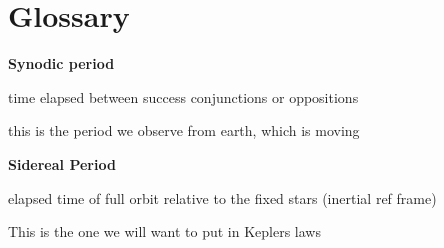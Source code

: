 \documentclass{article}
\begin{document}
\pagebreak
\section{Glossary}

\textbf{\large Synodic period }

\begin{list}{-}{}
\item time elapsed between success conjunctions or oppositions
\item this is the period we observe from earth, which is moving
\end{list}
\noindent
\textbf{\large Sidereal Period} 
\begin{list}{-}{}
\item elapsed time of full orbit relative to the fixed stars (inertial ref frame)
\item This is the one we will want to put in Keplers laws
\end{list}
\end{document}
